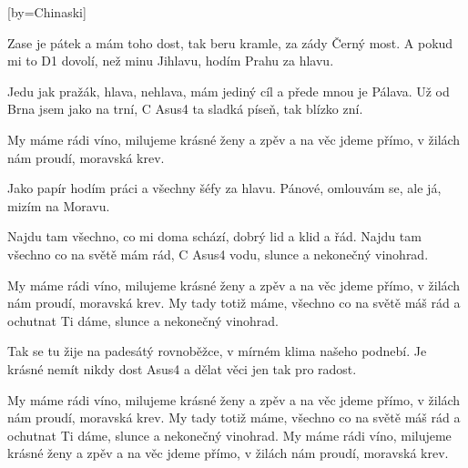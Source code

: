 [by={Chinaski}]

\beginverse{}
Zase je pátek a mám toho dost,
tak beru kramle, za zády Černý most.
A pokud mi to D1 dovolí,
než minu Jihlavu, hodím Prahu za hlavu.
\endverse{}

\beginverse{}
Jedu jak pražák, hlava, nehlava,
mám jediný cíl a přede mnou je Pálava.
Už od Brna jsem jako na trní,
C Asus4
ta sladká píseň, tak blízko zní.
\endverse{}

\beginchorus{}
\lrep{} My máme rádi víno, milujeme krásné ženy a zpěv
a na věc jdeme přímo, v žilách nám proudí, moravská krev. \rrep{}
\endchorus{}

\beginverse{}
Jako papír hodím práci
a všechny šéfy za hlavu.
Pánové, omlouvám se,
ale já, mizím na Moravu.
\endverse{}

\beginverse{}
Najdu tam všechno, co mi doma schází,
dobrý lid a klid a řád.
Najdu tam všechno co na světě mám rád,
C Asus4
vodu, slunce a nekonečný vinohrad.
\endverse{}

\beginchorus{}
My máme rádi víno, milujeme krásné ženy a zpěv
a na věc jdeme přímo, v žilách nám proudí, moravská krev.
My tady totiž máme, všechno co na světě máš rád
a ochutnat Ti dáme, slunce a nekonečný vinohrad.
\endchorus{}

\beginverse*{}
Tak se tu žije na padesátý rovnoběžce,
v mírném klima našeho podnebí.
Je krásné nemít nikdy dost
Asus4
a dělat věci jen tak pro radost.
\endverse{}

\beginchorus{}
My máme rádi víno, milujeme krásné ženy a zpěv
a na věc jdeme přímo, v žilách nám proudí, moravská krev.
My tady totiž máme, všechno co na světě máš rád
a ochutnat Ti dáme, slunce a nekonečný vinohrad.
My máme rádi víno, milujeme krásné ženy a zpěv
a na věc jdeme přímo, v žilách nám proudí, moravská krev.
\endchorus{}

\endsong{}
